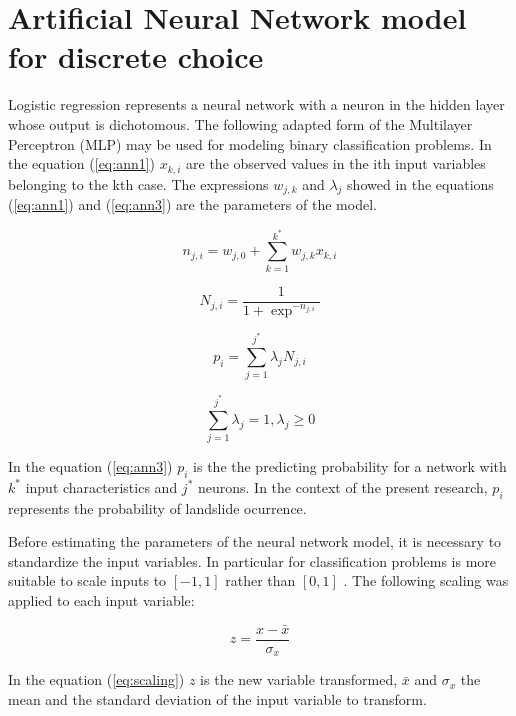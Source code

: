 \documentclass[11pt,twoside]{rmta2010esp}%
\begin{document}
\section{Artificial Neural Network model for discrete choice}
Logistic regression represents a neural network with 
a neuron in the hidden layer whose output is dichotomous. The following adapted form of the Multilayer Perceptron (MLP) may be used for modeling binary classification problems. In the equation (\ref{eq:ann1}) $x_{k,i}$ are the observed values in the ith input variables belonging to the kth case. The expressions $w_{j,k}$ and $\lambda_{j}$ showed in the equations (\ref{eq:ann1}) and (\ref{eq:ann3}) are the parameters of the model. 


\begin{equation}
n_{j,i} = w_{j,0} + \sum_{k=1}^{k^{*}} w_{j,k}x_{k,i}
\label{eq:ann1}
\end{equation}

\begin{equation}
N_{j,i} = \frac{1}{1+\exp^{-n_{j,i}}}
\label{eq:ann2}
\end{equation}



\begin{equation}
p_{i} = \sum_{j=1}^{j^{*}} \lambda_{j} N_{j,i}
\label{eq:ann3}
\end{equation}

\begin{equation}
\sum_{j=1}^{j^{*}} \lambda_{j} = 1 , \lambda_{j} \ge 0
\label{eq:ann4}
\end{equation}


In the equation (\ref{eq:ann3}) $p_{i}$ is the the predicting probability for a network with $ k^{*} $ input characteristics and $ j^{*} $ neurons. In the context of the present research, $p_{i} $ represents the probability of landslide ocurrence.

Before estimating the parameters of the neural network model, it is necessary to standardize the input variables. In particular for classification problems is more suitable to scale inputs to $[-1,1]$ rather than $[0,1]$ \cite{FAQANN}. The following scaling was applied to each input variable: 

\begin{equation}
z = \frac{x - \bar{x} }{\sigma_{x}}
\label{eq:scaling}
\end{equation}

In the equation (\ref{eq:scaling}) $z$ is the new variable transformed, $ \bar{x} $ and $\sigma_{x}$ the mean and the standard deviation of the input variable to transform.  
\end{document}
